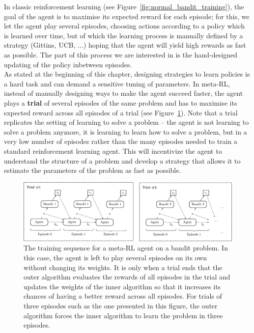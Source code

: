 In classic reinforcement learning (see Figure~\ref{fig:normal_bandit_training}),
the goal of the agent is to maximise its
expected reward for each episode; for this, we let the agent play several
episodes, choosing actions according to a policy which is learned over time, 
but of which the learning process is manually defined by a strategy (Gittins,
UCB, ...) hoping that the agent will yield high rewards as fast as possible.
The part of this process we are interested in is the hand-designed updating of
the policy inbetween episodes.\\

As stated at the beginning of this chapter, designing strategies to learn
policies is a hard task and can demand a sensitive tuning of parameters.
In meta-RL, instead of manually designing ways to make the agent succeed faster,
the agent plays a \textbf{trial}  of several episodes of the same problem
and has to maximise its expected reward across all episodes of a trial (see 
Figure~\ref{fig:meta_bandit_training}). Note that a trial replicates the setting
of learning to solve a problem -- the agent is not learning to solve a 
problem anymore, it is learning to learn how to solve a problem, but in 
a very low number of episodes rather than the many episodes needed 
to train a standard reinforcement learning agent. This will incentivize the agent
to understand the structure of a problem and develop a strategy that allows it 
to estimate the parameters of the problem as fast as possible.\\

\begin{figure}
	\centering
	\includegraphics[width=\linewidth]{fig/meta_bandit_training.eps}
	\caption{The training sequence for a meta-RL agent on a bandit problem.
	In this case, the agent is left to play several episodes on its own
	without changing its weights. It is only when a trial ends that the
	outer algorithm evaluates the rewards of all episodes in the trial and
	updates the weights of the inner algorithm so that it increases its
	chances of having a better reward across all episodes. For trials of 
	three episodes such as the one presented in this figure, the outer
	algorithm forces the inner algorithm to learn the problem in 
	three episodes.}
	\label{fig:meta_bandit_training}
\end{figure}

